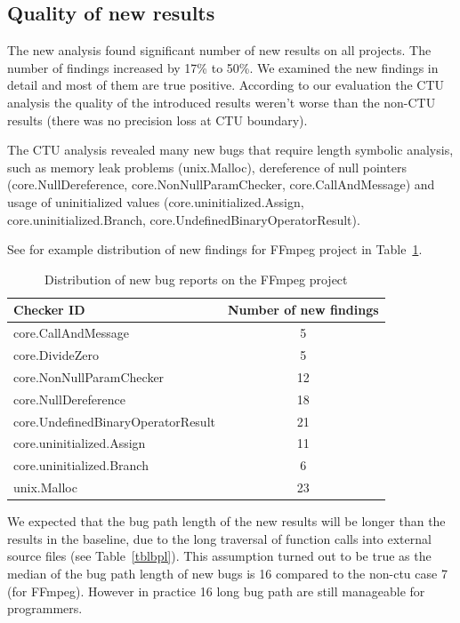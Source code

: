 \documentclass{article}
\begin{document}
\subsection{Quality of new results}
The new analysis found significant number of new results on all projects. 
The number of findings increased by 17\% to 50\%.
We examined the new findings in detail and most of them are true positive.
According to our evaluation the CTU analysis the quality of the introduced results
weren't worse than the non-CTU results (there was no precision loss at CTU boundary).

The CTU analysis revealed many new bugs that require length symbolic analysis,
such as memory leak problems (unix.Malloc), dereference of null pointers 
(core.NullDereference, core.NonNullParamChecker, core.CallAndMessage)
and usage of uninitialized values (core.uninitialized.Assign,\\ 
core.uninitialized.Branch, core.UndefinedBinaryOperatorResult). 

See for example distribution of new findings for FFmpeg project in 
Table~\ref{tblffmpegbugs}.

\begin {table}[h!]
\centering
\begin{tabular}{| l|| c |}
\hline
Checker ID&                          Number of new findings \\
\hline
\hline
core.CallAndMessage                &  5 \\
\hline
core.DivideZero                    & 5 \\     
\hline
core.NonNullParamChecker           & 12 \\     
\hline
core.NullDereference               & 18 \\     
\hline
core.UndefinedBinaryOperatorResult & 21 \\     
\hline
core.uninitialized.Assign          & 11 \\     
\hline
core.uninitialized.Branch          & 6  \\     
\hline
unix.Malloc                        & 23 \\
\hline
\end{tabular}
\caption{Distribution of new bug reports on the FFmpeg project}
\label{tblffmpegbugs}
\end{table}

We expected that the bug path length of the new results will be longer 
than the results in the baseline, due to the long traversal of function 
calls into external source files (see Table~\ref{tblbpl}). This assumption turned out to be true as
the median of the bug path length of new bugs is 16 compared to the non-ctu 
case 7 (for FFmpeg). However in practice 16 long bug path are still 
manageable for programmers.
\end{document}
